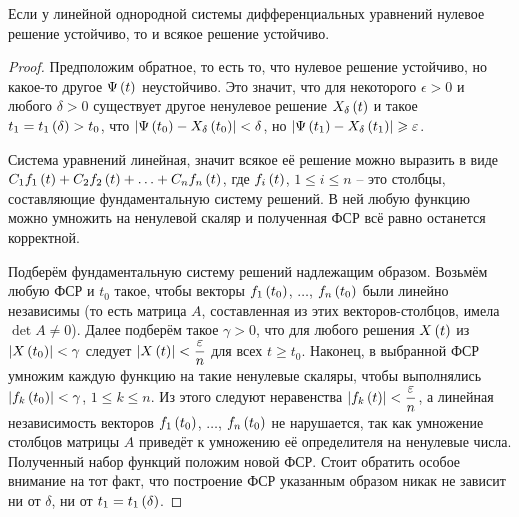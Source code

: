 \documentclass[a5paper,10pt]{article}
\begin{document}
\begin{lemma}
Если у линейной однородной системы дифференциальных уравнений нулевое решение устойчиво, то и всякое решение устойчиво.
\end{lemma}

\begin{proof}

Предположим обратное, то есть то, что нулевое решение устойчиво, но какое-то другое $\Psi\left(t\right)$ неустойчиво. Это значит, что для некоторого $\epsilon > 0$ и любого $\delta > 0$ существует другое ненулевое решение $X_{\delta}\left(t\right)$ и такое $t_{1} = t_{1}\left(\delta\right)> t_{0}$, что $\left|\Psi\left(t_{0}\right) - X_{\delta}\left(t_{0}\right)\right| < \delta$, но $\left|\Psi\left(t_{1}\right) - X_{\delta}\left(t_{1}\right)\right| \geqslant \varepsilon$.

Система уравнений линейная, значит всякое её решение можно выразить в виде 
$C_{1} f_{1}\left(t\right) + C_{2} f_{2}\left(t\right) + \ldots + C_{n} f_{n}\left(t\right)$, где
$f_{i}\left(t\right)$, $1 \le i \le n$ -- это столбцы,  составляющие фундаментальную систему решений. В ней любую функцию можно умножить на ненулевой скаляр и полученная ФСР всё равно останется корректной.

Подберём фундаментальную систему решений надлежащим образом. Возьмём любую ФСР и $t_{0}$ такое, чтобы векторы $f_{1}\left(t_{0}\right)$, $\ldots$, $f_{n}\left(t_{0}\right)$ были линейно независимы (то есть матрица $A$, составленная из этих векторов-столбцов, имела $\det A \ne 0$). Далее подберём такое $\gamma > 0$, что для любого решения $X\left(t\right)$ из $\left|X\left(t_{0}\right)\right| < \gamma$ следует $\left|X\left(t\right)\right| < \dfrac {\varepsilon} {n}$ для всех $t \ge t_{0}$. Наконец, в выбранной ФСР умножим каждую функцию на такие ненулевые скаляры, чтобы выполнялись $\left|f_{k}\left(t_{0}\right)\right| < \gamma$, $1 \le k \le n$. Из этого следуют неравенства $\left|f_{k}\left(t\right)\right| < \dfrac {\varepsilon} {n}$, а линейная независимость векторов $f_{1}\left(t_{0}\right)$, $\ldots$, $f_{n}\left(t_{0}\right)$ не нарушается, так как умножение столбцов матрицы $A$ приведёт к умножению её определителя на ненулевые числа. Полученный набор функций положим новой ФСР. Стоит обратить особое внимание на тот факт, что построение ФСР указанным образом никак не зависит ни от $\delta$, ни от $t_{1} = t_{1}\left(\delta\right)$.


\end{proof}
\end{document}

